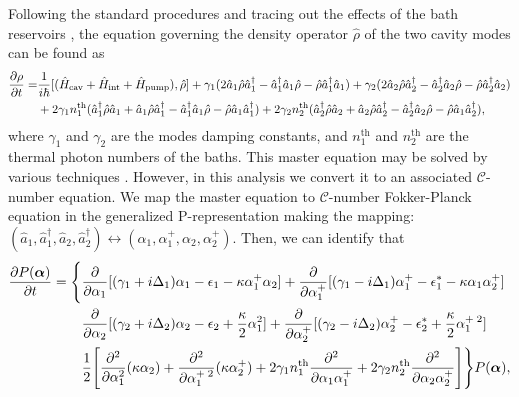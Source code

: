 \documentclass[fleqn,11pt]{wlscirep}
\begin{document}
Following the standard procedures and tracing out the effects of the bath reservoirs \cite{louisell1973,walls2008}, the equation governing the density operator $\hat{\rho}$ of the two cavity modes can be found as 
\begin{equation}
	\begin{aligned}
		\pdv{\rho}{t} =&
			\frac{1}{i\hbar} [(\hat{H}_{\text{cav}} + \hat{H}_{\text{int}} + \hat{H}_{\text{pump}}),\hat{\rho}] +
			\gamma_1(2\hat{a}_1\hat{\rho}\hat{a}_1^{\dagger} - 
			\hat{a}_1^{\dagger}\hat{a}_1\hat{\rho}
			-\hat{\rho}\hat{a}_1^{\dagger}\hat{a}_1) +
			\gamma_2(2\hat{a}_2\hat{\rho}\hat{a}_2^{\dagger} - 
			\hat{a}_2^{\dagger}\hat{a}_2\hat{\rho}
			-\hat{\rho}\hat{a}_2^{\dagger}\hat{a}_2) \\
			&+ 2\gamma_1n^{\text{th}}_1
			(\hat{a}_1^{\dagger}\hat{\rho}\hat{a}_1 + 
			\hat{a}_1\hat{\rho}\hat{a}_1^{\dagger} -
			\hat{a}_1^{\dagger}\hat{a}_1\hat{\rho}-
			\hat{\rho}\hat{a}_1\hat{a}_1^{\dagger})
			+ 2\gamma_2n^{\text{th}}_2
			(\hat{a}_2^{\dagger}\hat{\rho}\hat{a}_2 + 
			\hat{a}_2\hat{\rho}\hat{a}_2^{\dagger} -
			\hat{a}_2^{\dagger}\hat{a}_2\hat{\rho}-
			\hat{\rho}\hat{a}_1\hat{a}_2^{\dagger}),
	\end{aligned}
\end{equation}
where $\gamma_1$ and $\gamma_2$ are the modes damping constants, and $n^{\text{th}}_1$ and $n^{\text{th}}_2$ are the thermal photon numbers of the baths. This master equation may be solved by various techniques \cite{louisell1973}. However, in this analysis we convert it to an associated $\mathcal{C}$-number equation. We map the master equation to $\mathcal{C}$-number Fokker-Planck
equation in the generalized P-representation \cite{walls2008} making the mapping: $(\hat{a}_1,\hat{a}_1^{\dagger},\hat{a}_2,\hat{a}_2^{\dagger}) \leftrightarrow ({\alpha}_1,{\alpha}_1^{+},{\alpha}_2,{\alpha}_2^{+})$. Then, we can identify that 
\begin{equation}
	\begin{aligned}
		\pdv{P(\boldsymbol{\alpha})}{t} =
		\Bigg\{&
			\pdv{\alpha_1}[(\gamma_1 + i\Delta_1)\alpha_1 - \epsilon_1 - \kappa\alpha_1^+\alpha_2]
			+
			\pdv{\alpha_1^+}[(\gamma_1 - i\Delta_1)\alpha_1^+ - \epsilon_1^* - \kappa\alpha_1\alpha_2^+]
			\\
			&\pdv{\alpha_2}[(\gamma_2 + i\Delta_2)\alpha_2 - \epsilon_2 + \frac{\kappa}{2}\alpha_1^2]
			+
			\pdv{\alpha_2^+}[(\gamma_2 - i\Delta_2)\alpha_2^+ - \epsilon_2^* + \frac{\kappa}{2}\alpha_1^{+\;2}]
			\\
			& \frac{1}{2}
			\Bigg[
				\pdv[2]{\alpha_1}(\kappa\alpha_2) 
				+ \frac{\partial^2}{\partial\alpha_1^{+\;2}}(\kappa\alpha_2^+)
				+ 2\gamma_1n^{\text{th}}_1\frac{\partial^2}{\partial\alpha_1\alpha_1^+}
				+ 2\gamma_2n^{\text{th}}_2\frac{\partial^2}{\partial\alpha_2\alpha_2^+}
			\Bigg]
		\Bigg\}P(\boldsymbol{\alpha}),
	\end{aligned}
\end{equation}
\end{document}
